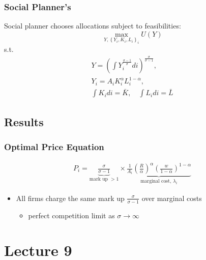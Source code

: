\documentclass[10pt]{article}
\begin{document}
\subsubsection{Social Planner's}

Social planner chooses allocations subject to feasibilities:
$$
\max _{Y,\left\{Y_i, K_i, L_i\right\}_i} U(Y)
$$
s.t.
$$
\begin{gathered}
Y=\left(\int Y_i^{\frac{\sigma-1}{\sigma}} d i\right)^{\frac{\sigma}{\sigma-1}}, \\
Y_i=A_i K_i^\alpha L_i^{1-\alpha}, \\
\int K_i d i=\bar{K}, \quad \int L_i d i=\bar{L}
\end{gathered}
$$


\subsection{Results}

\subsubsection{Optimal Price Equation}

\begin{align}
    P_i=\underbrace{\frac{\sigma}{\sigma-1}}_{\text {mark up }>1} \times \underbrace{\frac{1}{A_i}\left(\frac{R}{\alpha}\right)^\alpha\left(\frac{w}{1-\alpha}\right)^{1-\alpha}}_{\text {marginal cost, } \lambda_i}
\end{align}

\begin{itemize}
    \item All firms charge the same mark up $\frac{\sigma}{\sigma-1}$ over marginal costs
        \begin{itemize}
            \item perfect competition limit as $\sigma \rightarrow \infty$
        \end{itemize}
\end{itemize}


\section{Lecture 9}
\end{document}
